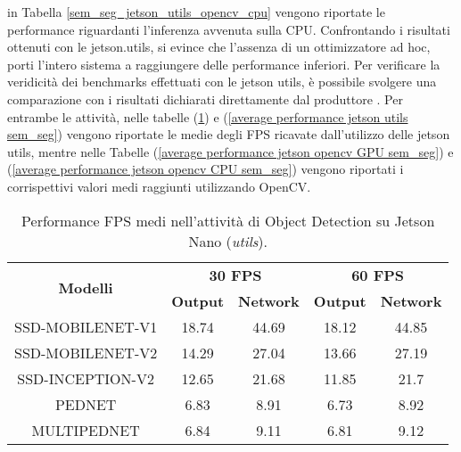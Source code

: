 in Tabella \ref{sem_seg_jetson_utils_opencv_cpu} vengono riportate le performance riguardanti l'inferenza 
avvenuta sulla CPU. Confrontando i risultati ottenuti con le jetson.utils, 
si evince che l'assenza di un ottimizzatore ad hoc, porti l'intero sistema a 
raggiungere delle performance inferiori. Per verificare la veridicità dei benchmarks 
effettuati con le jetson utils, è possibile svolgere una comparazione 
con i risultati dichiarati direttamente dal produttore \cite{performance_obj_det_jetson}. Per entrambe le 
attività, nelle tabelle (\ref{average performance jetson utils obj_det}) e (\ref{average performance jetson utils sem_seg}) vengono riportate le medie degli FPS 
ricavate dall'utilizzo delle jetson utils, mentre nelle Tabelle (\ref{average performance jetson opencv GPU sem_seg}) e (\ref{average performance jetson opencv CPU sem_seg})  
vengono riportati i corrispettivi valori medi raggiunti utilizzando OpenCV.

\begin{table}
    \renewcommand{\baselinestretch}{1}
    \centering
    \begin{adjustbox}{max width=\textwidth}
    \begin{tabular}{|c||c|c||c|c||}
        \hline
        \multirow{2}{*}{\bfseries{\Large Modelli}} & \multicolumn{2}{c||}{\bfseries{30 FPS}} & \multicolumn{2}{c||}{\bfseries{60 FPS}}\\            & \bfseries{Output} & \bfseries{Network} & \bfseries{Output} & \bfseries{Network}\\
        \hline
        \hline
        SSD-MOBILENET-V1 & 18.74 & 44.69 & 18.12 & 44.85\\
        \hline
        SSD-MOBILENET-V2 & 14.29 & 27.04 & 13.66 & 27.19\\
        \hline 
        SSD-INCEPTION-V2 & 12.65 & 21.68 & 11.85 & 21.7\\
        \hline
        PEDNET & 6.83 &  8.91 & 6.73 & 8.92\\
        \hline
        MULTIPEDNET & 6.84 & 9.11 & 6.81 & 9.12\\
        \hline
    \end{tabular}
    \end{adjustbox}
    \vspace{0.5cm}
    \caption{Performance FPS medi nell'attività di Object Detection su Jetson Nano (\emph{utils}).}
    \label{average performance jetson utils obj_det}
\end{table}

